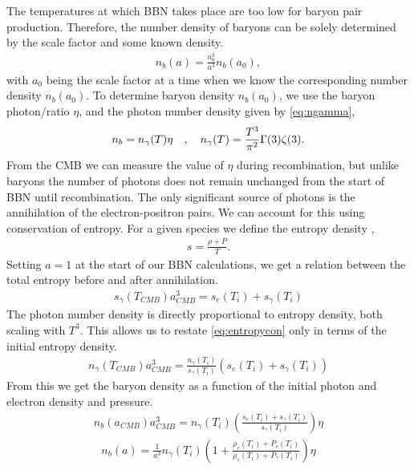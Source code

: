 The temperatures at which BBN takes place are too low for baryon pair production. Therefore, the number density of baryons can be solely determined by the scale factor and some known density. 
\begin{align}
    n_b(a)=\frac{a_0^3}{a^3}n_{b}(a_0),
\end{align}
with $a_0$ being the scale factor at a time when we know the corresponding number density $n_{b}(a_0)$. To determine baryon density $n_{b}(a_0)$, we use the baryon photon/ratio $\eta$, and the photon number density given by \cref{eq:ngamma}, 
\begin{align}
    n_b=n_\gamma(T) \eta \quad , \quad n_\gamma(T)=\frac{T^3}{\pi^2}\Gamma(3)\zeta(3).
\end{align}
From the CMB we can measure the value of $\eta$ during recombination, but unlike baryons the number of photons does not remain unchanged from the start of BBN until recombination. The only significant source of photons is the annihilation of the electron-positron pairs. We can account for this using conservation of entropy. For a given species we define the entropy density \cite[(3.91)]{kolbturner},
\begin{align}
    s=\frac{\rho+P}{T}.
\end{align}
Setting $a=1$ at the start of our BBN calculations, we get a relation between the total entropy before and after annihilation.
\begin{align}
     s_{\gamma}(T_{CMB})a_{CMB}^3= s_e(T_{i})+s_{\gamma}(T_{i})
    \label{eq:entropycon}
\end{align}
The photon number density is directly proportional to entropy density, both scaling with $T^3$. This allows us to restate \eqref{eq:entropycon} only in terms of the initial entropy density.
\begin{align}
    n_{\gamma}(T_{CMB})a_{CMB}^3 = \frac{n_\gamma(T_{i})}{s_{\gamma}(T_{i})}\left(s_e(T_{i})+s_{\gamma}(T_{i})\right)
\end{align}
From this we get the baryon density as a function of the initial photon and electron density and pressure.
\begin{align}
    n_b(a_{CMB}){a_{CMB}^3}=n_\gamma(T_{i}) \left(\frac{s_e(T_{i})+s_{\gamma}(T_{i})}{s_{\gamma}(T_{i})}\right)\eta
\end{align}
\begin{align}
    n_b(a)=\frac{1}{a^3}n_\gamma(T_{i}) \left(1+\frac{\rho_e(T_{i})+P_{e}(T_{i})}{\rho_{\gamma}(T_{i})+P_{\gamma}(T_{i})}\right)\eta
    \label{n_b}
\end{align}
